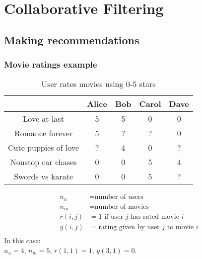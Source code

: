 \chapter{Collaborative Filtering}
\section{Making recommendations}
\subsection*{Movie ratings example}
\begin{table}[H]
    \centering
    \begin{tabular}{ccccc}
        \toprule
        & Alice & Bob & Carol & Dave \\
        \midrule
        Love at last & 5 & 5 & 0 & 0 \\
        Romance forever & 5 & ? & ? & 0 \\
        Cute puppies of love & ? & 4 & 0 & ? \\
        Nonstop car chases & 0 & 0 & 5 & 4 \\
        Swords vs karate & 0 & 0 & 5 & ? \\
        \bottomrule
    \end{tabular}
    \caption{User rates movies using 0-5 stars}
\end{table}

\begin{notebox}
    \begin{align*}
    n_u &= \text{number of users}\\
    n_m &= \text{number of movies}\\
    r(i,j) &= \text{1 if user $j$ has rated movie $i$}\\
    y(i,j) &= \text{rating given by user $j$ to movie $i$}\\
    \end{align*}
    \hspace*{2em}In this case:\\
    \hspace*{4em}$n_u = 4$,   $n_m = 5$,   $r(1,1) = 1$,   $y(3,1) = 0$.
\end{notebox}

